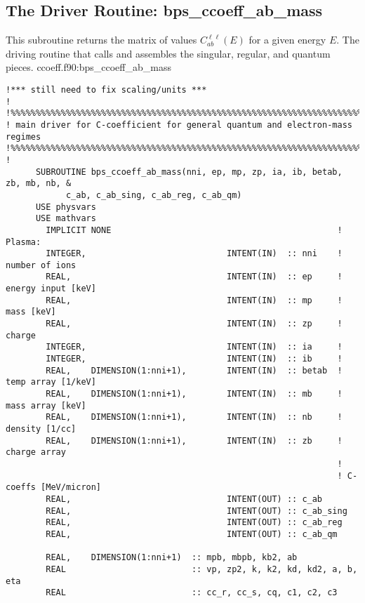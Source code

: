 \documentclass[preprint,12pt,eqsecnum,nofootinbib,amsmath,amssymb]{revtex4}
\begin{document}
\subsection{The Driver Routine:
\lowercase{bps}\_\lowercase{ccoeff}\_\lowercase{ab}\_\lowercase{mass}}

This subroutine returns the matrix of values $C^{\ell\ell}_{ab}(E)$ for a
given energy $E$. The driving routine that calls and assembles the
singular, regular, and quantum pieces.  
\vskip0.4cm
\noindent
ccoeff.f90:bps\_ccoeff\_ab\_mass
{
\baselineskip 10pt
\begin{verbatim}
!*** still need to fix scaling/units ***
!
!%%%%%%%%%%%%%%%%%%%%%%%%%%%%%%%%%%%%%%%%%%%%%%%%%%%%%%%%%%%%%%%%%%%%%%%%%%%%
! main driver for C-coefficient for general quantum and electron-mass regimes
!%%%%%%%%%%%%%%%%%%%%%%%%%%%%%%%%%%%%%%%%%%%%%%%%%%%%%%%%%%%%%%%%%%%%%%%%%%%%
!
      SUBROUTINE bps_ccoeff_ab_mass(nni, ep, mp, zp, ia, ib, betab, zb, mb, nb, &
            c_ab, c_ab_sing, c_ab_reg, c_ab_qm)
      USE physvars
      USE mathvars    
        IMPLICIT NONE                                             ! Plasma:
        INTEGER,                            INTENT(IN)  :: nni    !  number of ions
        REAL,                               INTENT(IN)  :: ep     !  energy input [keV]
        REAL,                               INTENT(IN)  :: mp     !  mass [keV]
        REAL,                               INTENT(IN)  :: zp     !  charge
        INTEGER,                            INTENT(IN)  :: ia     !  
        INTEGER,                            INTENT(IN)  :: ib     !  
        REAL,    DIMENSION(1:nni+1),        INTENT(IN)  :: betab  !  temp array [1/keV]
        REAL,    DIMENSION(1:nni+1),        INTENT(IN)  :: mb     !  mass array [keV]
        REAL,    DIMENSION(1:nni+1),        INTENT(IN)  :: nb     !  density [1/cc]
        REAL,    DIMENSION(1:nni+1),        INTENT(IN)  :: zb     !  charge array
                                                                  !
                                                                  ! C-coeffs [MeV/micron]
        REAL,                               INTENT(OUT) :: c_ab
        REAL,                               INTENT(OUT) :: c_ab_sing
        REAL,                               INTENT(OUT) :: c_ab_reg
        REAL,                               INTENT(OUT) :: c_ab_qm

        REAL,    DIMENSION(1:nni+1)  :: mpb, mbpb, kb2, ab
        REAL                         :: vp, zp2, k, k2, kd, kd2, a, b, eta
        REAL                         :: cc_r, cc_s, cq, c1, c2, c3


\end{verbatim}}
\end{document}
